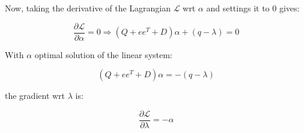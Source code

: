 Now, taking the derivative of the Lagrangian $\mathcal{L}$ wrt $\alpha$ and settings it to 0 gives:

\begin{equation} \label{eq:l2_svr_lb_lagrangian_der_a}
	\frac{\partial \mathcal{L}}{\partial \alpha}=0\Rightarrow (Q + ee^T + D) \alpha + (q - \lambda) = 0
\end{equation}

With $\alpha$ optimal solution of the linear system:

\begin{equation} \label{eq:l2_svr_lb_lagrangian_sol}
    (Q + ee^T + D) \alpha = - (q - \lambda)
\end{equation}

the gradient wrt $\lambda$ is:

\begin{equation} \label{eq:l2_svr_lb_lagrangian_der_l}
    \frac{\partial \mathcal{L}}{\partial \lambda}=-\alpha
\end{equation}
